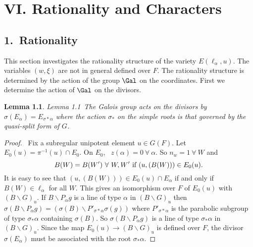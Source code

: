 \documentclass{memo-l}
\newtheorem{lemma}[theorem]{Lemma}
\theoremstyle{definition}
\theoremstyle{remark}
\numberwithin{section}{chapter}
\numberwithin{equation}{chapter}
\begin{document}


\chapter {VI. Rationality and Characters} 
 




\section{1.\ Rationality}

   This section investigates the rationality structure of the variety
$E({\ell}_{{\alpha}},u)$.  The variables $(w,{\xi})$ are not in general
defined over $F$.  The rationality structure is determined by the action of
the group $\Gal$ on the coordinates.  First we determine the
action of $\Gal$ on the divisors.



\begin{lemma}{Lemma 1.1}\ The Galois group acts on the divisors by
${\sigma}(E_{{\alpha}}) = E_{{\sigma}*{\alpha}}$ where the action
${\sigma}_{*}$ on the simple roots is that governed by the quasi-split form
of $G$.
\end{lemma}

\begin{proof} \  Fix a subregular unipotent element $u  \in  G(F)$.  Let $E_{0}(u)
 =  {\pi}^{-1}(u)  \cap  E_{0}$.  On $E_{0}$, \  $z({\alpha}) = 0 {\ \forall\  }
{\alpha}$.  So $n_{w} = 1 {\ \forall\ } W$ and $$B(W) = B(W') {\ \forall\ }
W,W'\ \hbox{if} \  (u,(B(W)))  \in  E_{0}(u).$$ It is easy to see that $(u,(B(W)))
 \in  E_{0}(u)  \cap  E_{{\alpha}}$ if and only if $B(W)  \in 
{\ell}_{{\alpha}}$ for all $W$.  This gives an isomorphism over $F$ of
$E_{0}(u)$ with $(B\backslash G)_{u}$.  If $B\backslash P_{{\alpha}}g$ is a
line of type ${\alpha}$ in $(B\backslash G)_{u}$ then ${\sigma}(B\backslash
P_{{\alpha}}g)  =  ({\sigma}(B)\backslash P'_{{\sigma}*{\alpha}}{\sigma}(g))$
where $P'_{{\sigma}*{\alpha}}$ is the parabolic subgroup of type
${\sigma}_{*}{\alpha}$ containing ${\sigma}(B)$.  So ${\sigma}(B\backslash
P_{{\alpha}}g)$ is a line of type ${\sigma}_{*}{\alpha}$ in $(B\backslash
G)_{u}$.  Since the map $E_{0}(u) {\to} (B\backslash G)_{u}$ is defined
over $F$, the divisor ${\sigma}(E_{{\alpha}})$ must be associated with the
root ${\sigma}_{*}{\alpha}$.
\end{proof} 
\end{document}
